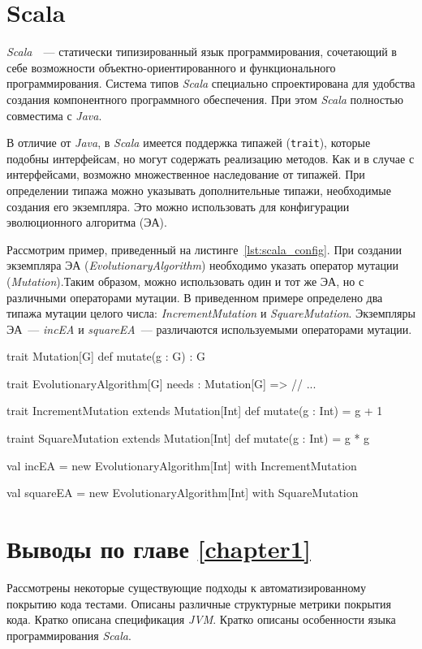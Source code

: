 \section{Scala}
\textit{Scala}~\cite{scala_lang}~--- статически типизированный язык программирования, сочетающий в себе возможности объектно-ориентированного и функционального 
программирования. Система типов \textit{Scala} специально спроектирована для удобства создания компонентного программного обеспечения. При этом \textit{Scala} 
полностью совместима с \textit{Java}.

В отличие от \textit{Java}, в \textit{Scala} имеется поддержка типажей (\texttt{trait}), которые подобны интерфейсам, но могут содержать реализацию методов. 
Как и в случае с интерфейсами, возможно множественное наследование от типажей. При определении типажа можно указывать дополнительные типажи, необходимые 
создания его экземпляра. Это можно использовать для конфигурации эволюционного алгоритма (ЭА). 

Рассмотрим пример, приведенный на листинге~\ref{lst:scala_config}. При создании экземпляра ЭА (\textit{EvolutionaryAlgorithm}) необходимо указать оператор 
мутации (\textit{Mutation}).Таким образом, можно использовать один и тот же ЭА, но с различными операторами мутации. В приведенном примере определено 
два типажа мутации целого числа: \textit{IncrementMutation} и \textit{SquareMutation}. Экземпляры ЭА~--- \textit{incEA} и \textit{squareEA}~--- различаются
используемыми операторами мутации.

\begin{snippet}[caption=Пример конфигурации эволюционного алгоритма, label={lst:scala_config}]
trait Mutation[G] {  
  def mutate(g : G) : G
}

trait EvolutionaryAlgorithm[G] {
  needs : Mutation[G] =>  // %
  ...
}

trait IncrementMutation extends Mutation[Int] {
  def mutate(g : Int) = g + 1
}

traint SquareMutation extends Mutation[Int] {
  def mutate(g : Int) = g * g
}

val incEA = new EvolutionaryAlgorithm[Int] with IncrementMutation

val squareEA = new EvolutionaryAlgorithm[Int] with SquareMutation
\end{snippet}

\section{Выводы по главе \ref{chapter1}}
Рассмотрены некоторые существующие подходы к автоматизированному покрытию кода тестами. Описаны различные структурные метрики покрытия кода. Кратко описана 
спецификация \textit{JVM}. Кратко описаны особенности языка программирования \textit{Scala}.





